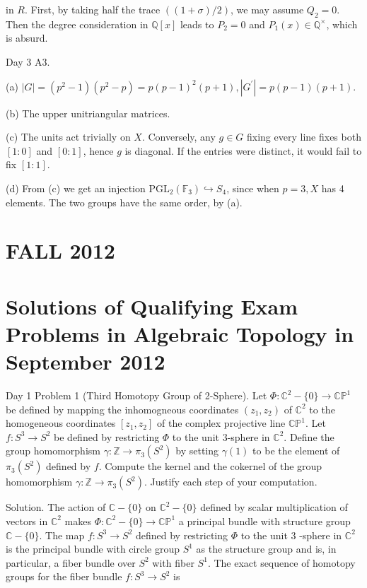 \documentclass[10pt]{article}
\begin{document}
in $R$. First, by taking half the trace $((1+\sigma) / 2)$, we may assume $Q_{2}=0$. Then the degree consideration in $\mathbb{Q}[x]$ leads to $P_{2}=0$ and $P_{1}(x) \in \mathbb{Q}^{\times}$, which is absurd.

Day 3 A3.

(a) $|G|=\left(p^{2}-1\right)\left(p^{2}-p\right)=p(p-1)^{2}(p+1),\left|G^{\prime}\right|=p(p-1)(p+1)$.

(b) The upper unitriangular matrices.

(c) The units act trivially on $X$. Conversely, any $g \in G$ fixing every line fixes both $[1: 0]$ and $[0: 1]$, hence $g$ is diagonal. If the entries were distinct, it would fail to fix $[1: 1]$.

(d) From (c) we get an injection $\mathrm{PGL}_{2}\left(\mathbb{F}_{3}\right) \hookrightarrow S_{4}$, since when $p=3, X$ has 4 elements. The two groups have the same order, by (a).

\section{FALL 2012}
\section{Solutions of Qualifying Exam Problems in Algebraic Topology in September 2012}
Day 1 Problem 1 (Third Homotopy Group of 2-Sphere). Let $\Phi: \mathbb{C}^{2}-\{0\} \rightarrow \mathbb{C P}^{1}$ be defined by mapping the inhomogneous coordinates $\left(z_{1}, z_{2}\right)$ of $\mathbb{C}^{2}$ to the homogeneous coordinates $\left[z_{1}, z_{2}\right]$ of the complex projective line $\mathbb{C P}^{1}$. Let $f: S^{3} \rightarrow S^{2}$ be defined by restricting $\Phi$ to the unit 3-sphere in $\mathbb{C}^{2}$. Define the group homomorphism $\gamma: \mathbb{Z} \rightarrow \pi_{3}\left(S^{2}\right)$ by setting $\gamma(1)$ to be the element of $\pi_{3}\left(S^{2}\right)$ defined by $f$. Compute the kernel and the cokernel of the group homomorphism $\gamma: \mathbb{Z} \rightarrow \pi_{3}\left(S^{2}\right)$. Justify each step of your computation.

Solution. The action of $\mathbb{C}-\{0\}$ on $\mathbb{C}^{2}-\{0\}$ defined by scalar multiplication of vectors in $\mathbb{C}^{2}$ makes $\Phi: \mathbb{C}^{2}-\{0\} \rightarrow \mathbb{C P}^{1}$ a principal bundle with structure group $\mathbb{C}-\{0\}$. The map $f: S^{3} \rightarrow S^{2}$ defined by restricting $\Phi$ to the unit 3 -sphere in $\mathbb{C}^{2}$ is the principal bundle with circle group $S^{1}$ as the structure group and is, in particular, a fiber bundle over $S^{2}$ with fiber $S^{1}$. The exact sequence of homotopy groups for the fiber bundle $f: S^{3} \rightarrow S^{2}$ is
\end{document}
